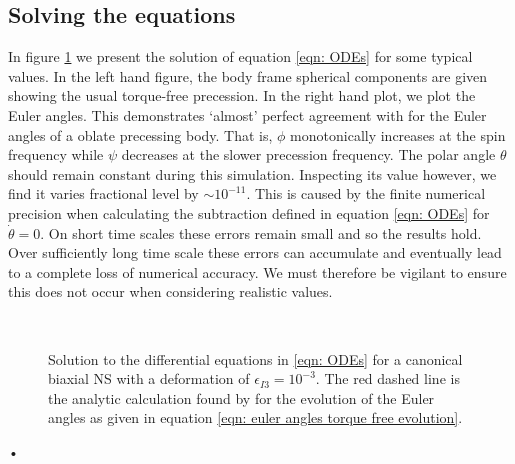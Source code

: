 \documentclass[/home/greg/Thesis/main/main.tex]{subfiles}
\begin{document}
\subsection{Solving the equations}
In figure \ref{fig: biaxial body no torque} we present the solution of equation
\eqref{eqn: ODEs} for some typical values. In the left hand figure, the body
frame spherical components are given showing the usual torque-free precession.
In the right hand plot, we plot the Euler angles. This demonstrates `almost'
perfect agreement with \citet{Jones2001} for the Euler angles of a oblate
precessing body. That is, $\phi$ monotonically increases at the spin frequency
while $\psi$ decreases at the slower precession frequency. The polar angle
$\theta$ should remain constant during this simulation. Inspecting its value
however, we find it varies fractional level by $\sim 10^{-11}$.
This is caused by the finite numerical precision when calculating the
subtraction defined in equation \eqref{eqn: ODEs} for $\dot{\theta}=0$. On
short time scales these errors remain small and so
the results hold.  Over sufficiently long time scale these errors can
accumulate and eventually lead to a complete loss of numerical accuracy. We
must therefore be vigilant to ensure this does not occur when considering
realistic values.
\begin{figure}[ht]
    \centering
{} \\
\caption{Solution to the differential equations in \eqref{eqn: ODEs} for a
canonical biaxial NS with a deformation of $\epsilon_{I3} = 10^{-3}$. The red
dashed line is the analytic calculation found by \citet{Jones2001} for the
evolution of the Euler angles as given in equation 
\eqref{eqn: euler angles torque free evolution}.}
\label{fig: biaxial body no torque}
\end{figure}•
\end{document}

